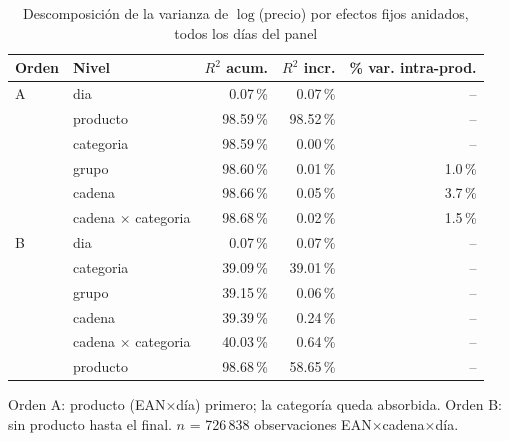 \begin{table}[htbp]
\caption{Descomposici\'on de la varianza de $\log$(precio) por efectos fijos anidados, todos los d\'ias del panel}
\label{tab:varianza}
\centering\scriptsize\setlength{\tabcolsep}{3pt}
\begin{tabular}{@{}llrrr@{}}
\toprule
Orden & Nivel & $R^2$ acum. & $R^2$ incr. & \% var. intra-prod. \\
\midrule
A & dia & 0.07\,\% & 0.07\,\% & -- \\
 & producto & 98.59\,\% & 98.52\,\% & -- \\
 & categoria & 98.59\,\% & 0.00\,\% & -- \\
 & grupo & 98.60\,\% & 0.01\,\% & 1.0\,\% \\
 & cadena & 98.66\,\% & 0.05\,\% & 3.7\,\% \\
 & cadena $\times$ categoria & 98.68\,\% & 0.02\,\% & 1.5\,\% \\
\midrule
B & dia & 0.07\,\% & 0.07\,\% & -- \\
 & categoria & 39.09\,\% & 39.01\,\% & -- \\
 & grupo & 39.15\,\% & 0.06\,\% & -- \\
 & cadena & 39.39\,\% & 0.24\,\% & -- \\
 & cadena $\times$ categoria & 40.03\,\% & 0.64\,\% & -- \\
 & producto & 98.68\,\% & 58.65\,\% & -- \\
\bottomrule\end{tabular}
\par\smallskip\raggedright\scriptsize Orden A: producto (EAN$\times$d\'ia) primero; la categor\'ia queda absorbida. Orden B: sin producto hasta el final. $n$ = 726\,838 observaciones EAN$\times$cadena$\times$d\'ia.
\end{table}
